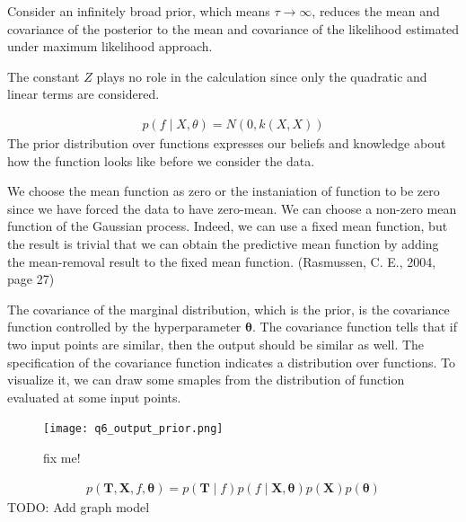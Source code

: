 \documentclass[12pt]{article}
\newenvironment{question}[2][Question]{\begin{trivlist}
\kern10pt
\item[\hskip \labelsep {\bfseries #1}\hskip \labelsep {\bfseries #2.}]}{\end{trivlist}}
\begin{document}
\begin{question}{5}
Consider an infinitely broad prior, which means $\tau \to \infty$, reduces the 
mean and covariance of the posterior to the mean and covariance of the likelihood
estimated under maximum likelihood approach. \par

The constant $Z$ plays no role in the calculation since only the quadratic and linear
 terms are considered.

\end{question}

\begin{question}{6}
\begin{align*}
  p(f\mid X,\theta) = N(0, k(X, X))  %
\end{align*}
  The prior distribution over functions expresses our beliefs and knowledge about
how the function looks like before we consider the data.

We choose the mean function as zero or the instaniation of function to be zero
 since we have forced the data to have zero-mean. We can choose a non-zero mean
 function of the Gaussian process. Indeed, we can use a fixed mean function, but
 the result is trivial that we can obtain the predictive mean function by adding 
 the mean-removal result to the fixed mean function.
 (Rasmussen, C. E., 2004, page 27)

The covariance of the marginal distribution, which is the prior, is the covariance
function controlled by the hyperparameter $\bm{\theta}$. The covariance function
tells that if two input points are similar, then the output should be similar as
well. The specification of the covariance function indicates a distribution over 
functions. To visualize it, we can draw some smaples from the distribution of 
function evaluated at some input points.

\begin{figure}[h!]
  \centering
  \texttt{[image: q6\_output\_prior.png]}
  \caption{fix me!}
  \label{fig:fix me!}
\end{figure}
\end{question}

\begin{question}{7}
  \begin{align*}
    p(\mathbf{T}, \mathbf{X}, f, \bm{\theta}) 
      = p(\mathbf{T}\mid f)p(f \mid \mathbf{X},\bm{\theta})
      p(\mathbf{X})p(\bm{\theta}) 
  \end{align*}
  TODO: Add graph model
\end{question}
\end{document}
